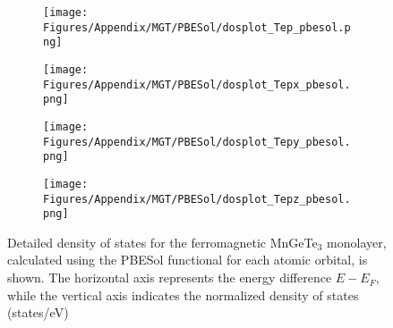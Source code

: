 \begin{figure}[H]
\hfill
\begin{subfigure}{0.24\textwidth}
    \texttt{[image: Figures/Appendix/MGT/PBESol/dosplot\_Tep\_pbesol.png]}
    \label{dosplot_MnTep_pbesol}
\end{subfigure}
\hfill
\begin{subfigure}{0.24\textwidth}
    \texttt{[image: Figures/Appendix/MGT/PBESol/dosplot\_Tepx\_pbesol.png]}
    \label{dosplot_MnTepx_pbesol}
\end{subfigure}
\hfill
\begin{subfigure}{0.24\textwidth}
    \texttt{[image: Figures/Appendix/MGT/PBESol/dosplot\_Tepy\_pbesol.png]}
    \label{dosplot_MnTepy_pbesol}
\end{subfigure}
\begin{subfigure}{0.24\textwidth}
    \texttt{[image: Figures/Appendix/MGT/PBESol/dosplot\_Tepz\_pbesol.png]}
    \label{dosplot_MnTepz_pbesol}
\end{subfigure}
\hfill
     \caption{Detailed density of states for the ferromagnetic MnGeTe$_3$ monolayer, calculated using the PBESol functional for each atomic orbital, is shown. The horizontal axis represents the energy difference $E - E_F$, while the vertical axis indicates the normalized density of states (states/eV)}
     \label{MnPbesol}
 \end{figure}

